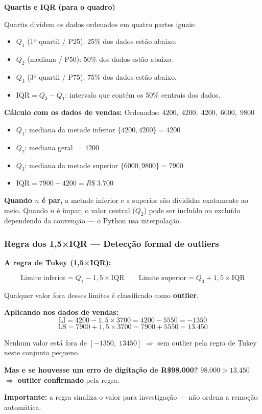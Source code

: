 \begin{BoardBox}
\textbf{Quartis e IQR (para o quadro)}

Quartis dividem os dados ordenados em quatro partes iguais:
\begin{itemize}
  \item $Q_1$ (1º quartil / P25): 25\% dos dados estão abaixo.
  \item $Q_2$ (mediana / P50): 50\% dos dados estão abaixo.
  \item $Q_3$ (3º quartil / P75): 75\% dos dados estão abaixo.
  \item $\text{IQR} = Q_3 - Q_1$: intervalo que contém os 50\% centrais dos dados.
\end{itemize}

\textbf{Cálculo com os dados de vendas:}
Ordenados: $4200,\; 4200,\; 4200,\; 6000,\; 9800$

\begin{itemize}
  \item $Q_1$: mediana da metade inferior $\{4200, 4200\} = 4200$
  \item $Q_2$: mediana geral $= 4200$
  \item $Q_3$: mediana da metade superior $\{6000, 9800\} = 7900$
  \item $\text{IQR} = 7900 - 4200 = R\$\;3.700$
\end{itemize}

\textbf{Quando $n$ é par,} a metade inferior e a superior são divididas
exatamente ao meio. Quando $n$ é ímpar, o valor central ($Q_2$) pode ser
incluído ou excluído dependendo da convenção — o Python usa interpolação.
\end{BoardBox}

\subsubsection*{Regra dos 1,5×IQR — Detecção formal de outliers}

\begin{SolvedBox}
\textbf{A regra de Tukey (1,5×IQR):}

\[
\text{Limite inferior} = Q_1 - 1{,}5 \times \text{IQR}
\qquad
\text{Limite superior} = Q_3 + 1{,}5 \times \text{IQR}
\]

Qualquer valor fora desses limites é classificado como \textbf{outlier}.

\textbf{Aplicando nos dados de vendas:}
\[
\text{LI} = 4200 - 1{,}5 \times 3700 = 4200 - 5550 = -1350
\]
\[
\text{LS} = 7900 + 1{,}5 \times 3700 = 7900 + 5550 = 13.450
\]

Nenhum valor está fora de $[-1350,\; 13450]$ $\Rightarrow$ sem outlier pela regra
de Tukey neste conjunto pequeno.

\textbf{Mas e se houvesse um erro de digitação de R\$98.000?}
$98.000 > 13.450$ $\Rightarrow$ \textbf{outlier confirmado} pela regra.

\textbf{Importante:} a regra sinaliza o valor para investigação — não ordena
a remoção automática.
\end{SolvedBox}

